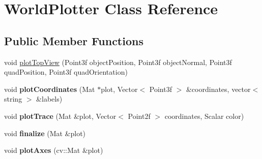 \hypertarget{classWorldPlotter}{
\section{WorldPlotter Class Reference}
\label{classWorldPlotter}
}
\subsection*{Public Member Functions}
\begin{DoxyCompactItemize}
\item 
void \hyperlink{classWorldPlotter_ab01669f1e5081c172f7c7cddf10c4d09}{plotTopView} (Point3f objectPosition, Point3f objectNormal, Point3f quadPosition, Point3f quadOrientation)
\item 
\hypertarget{classWorldPlotter_a27140f0ab74f79c557e0244ca069fc3a}{
void {\bfseries plotCoordinates} (Mat $\ast$plot, Vector$<$ Point3f $>$ \&coordinates, vector$<$ string $>$ \&labels)}
\label{classWorldPlotter_a27140f0ab74f79c557e0244ca069fc3a}

\item 
\hypertarget{classWorldPlotter_aebac1a731459a26836ed8b7a788153c6}{
void {\bfseries plotTrace} (Mat \&plot, Vector$<$ Point2f $>$ coordinates, Scalar color)}
\label{classWorldPlotter_aebac1a731459a26836ed8b7a788153c6}

\item 
\hypertarget{classWorldPlotter_a7847eb27daf2f2fadcfb510998420e7e}{
void {\bfseries finalize} (Mat \&plot)}
\label{classWorldPlotter_a7847eb27daf2f2fadcfb510998420e7e}

\item 
\hypertarget{classWorldPlotter_a4b9a493bcc6459ff52319b493c9ba10c}{
void {\bfseries plotAxes} (cv::Mat \&plot)}
\label{classWorldPlotter_a4b9a493bcc6459ff52319b493c9ba10c}

\end{DoxyCompactItemize}
